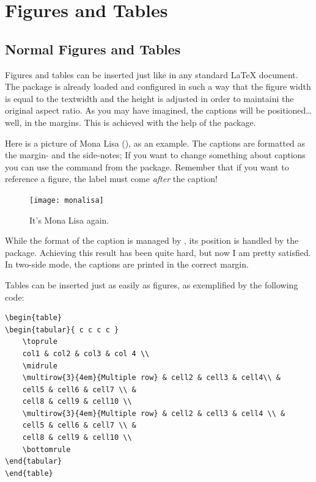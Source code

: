 \setchapterpreamble[u]{\margintoc}
\chapter[Figures and Tables]{Figures and Tables\footnotemark[0]}


\section{Normal Figures and Tables}

Figures and tables can be inserted just like in any standard 
\LaTeX\xspace document. The  package is already loaded 
and configured in such a way that the figure width is equal to the 
textwidth and the height is adjusted in order to maintaini the original 
aspect ratio. As you may have imagined, the captions will be 
positioned\ldots well, in the margins. This is achieved with the help of 
the  package.

Here is a picture of Mona Lisa (), as an example. 
The captions are formatted as the margin- and the side-notes; If you 
want to change something about captions you can use the command 
 from the  package. Remember that if 
you want to reference a figure, the label must come \emph{after} the 
caption!

\begin{figure}[hb]
	\texttt{[image: monalisa]}
	\caption[Mona Lisa, again]{It's Mona Lisa again. \blindtext}
\end{figure}

While the format of the caption is managed by , its 
position is handled by the  package. Achieving this 
result has been quite hard, but now I am pretty satisfied. In two-side 
mode, the captions are printed in the correct margin.

Tables can be inserted just as easily as figures, as exemplified by the 
following code:

\begin{lstlisting}
\begin{table}
\begin{tabular}{ c c c c }
	\toprule
	col1 & col2 & col3 & col 4 \\
	\midrule
	\multirow{3}{4em}{Multiple row} & cell2 & cell3 & cell4\\ &
	cell5 & cell6 & cell7 \\ &
	cell8 & cell9 & cell10 \\
	\multirow{3}{4em}{Multiple row} & cell2 & cell3 & cell4 \\ &
	cell5 & cell6 & cell7 \\ &
	cell8 & cell9 & cell10 \\
	\bottomrule
\end{tabular}
\end{table}
\end{lstlisting}

